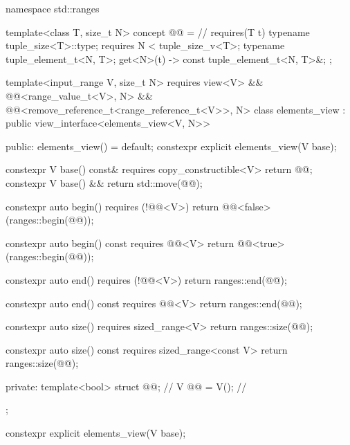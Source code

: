 %
%
%
%
%
\begin{codeblock}
namespace std::ranges {
  template<class T, size_t N>
  concept @@ =                   // \expos
    requires(T t) {
      typename tuple_size<T>::type;
      requires N < tuple_size_v<T>;
      typename tuple_element_t<N, T>;
      { get<N>(t) } -> const tuple_element_t<N, T>&;
    };


  template<input_range V, size_t N>
    requires view<V> && @@<range_value_t<V>, N> &&
      @@<remove_reference_t<range_reference_t<V>>, N>
  class elements_view : public view_interface<elements_view<V, N>> {
  public:
    elements_view() = default;
    constexpr explicit elements_view(V base);

    constexpr V base() const& requires copy_constructible<V> { return @@; }
    constexpr V base() && { return std::move(@@); }

    constexpr auto begin() requires (!@@<V>)
    { return @@<false>(ranges::begin(@@)); }

    constexpr auto begin() const requires @@<V>
    { return @@<true>(ranges::begin(@@)); }

    constexpr auto end() requires (!@@<V>)
    { return ranges::end(@@); }

    constexpr auto end() const requires @@<V>
    { return ranges::end(@@); }

    constexpr auto size() requires sized_range<V>
    { return ranges::size(@@); }

    constexpr auto size() const requires sized_range<const V>
    { return ranges::size(@@); }

  private:
    template<bool> struct @@;                     // \expos
    V @@ = V();                                      // \expos
  };
}
\end{codeblock}

%
\begin{itemdecl}
constexpr explicit elements_view(V base);
\end{itemdecl}

